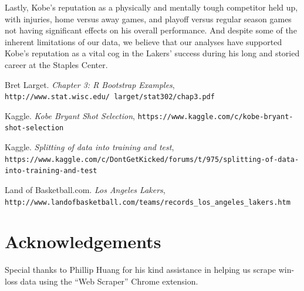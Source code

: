 \documentclass[paper=a4, fontsize=11pt]{scrartcl} %
\numberwithin{equation}{section} %
\numberwithin{figure}{section} %
\numberwithin{table}{section} %
\begin{document}
\hspace*{1cm}Lastly, Kobe's reputation as a physically and mentally tough competitor held up, with injuries, home versus away games, and playoff versus regular season games not having significant effects on his overall performance. And despite some of the inherent limitations of our data, we believe that our analyses have supported Kobe's reputation as a vital cog in the Lakers' success during his long and storied career at the Staples Center. 
\begin{thebibliography}{9}
	Bret Larget.
	\textit{Chapter 3: R Bootstrap Examples}, \\\texttt{http://www.stat.wisc.edu/~larget/stat302/chap3.pdf}
	
	Kaggle. 
	\textit{Kobe Bryant Shot Selection}, \texttt{https://www.kaggle.com/c/kobe-bryant-shot-selection}

	Kaggle. 
	\textit{Splitting of data into training and test},\\ \texttt{https://www.kaggle.com/c/DontGetKicked/forums/t/975/splitting-of-data-into-training-and-test}

	Land of Basketball.com.
	\textit{Los Angeles Lakers}, \\\texttt{http://www.landofbasketball.com/teams/records\_los\_angeles\_lakers.htm}
	


\end{thebibliography}
\section*{Acknowledgements}
\hspace*{1cm}Special thanks to Phillip Huang for his kind assistance in helping us scrape win-loss data using the ``Web Scraper'' Chrome extension.
\end{document}
